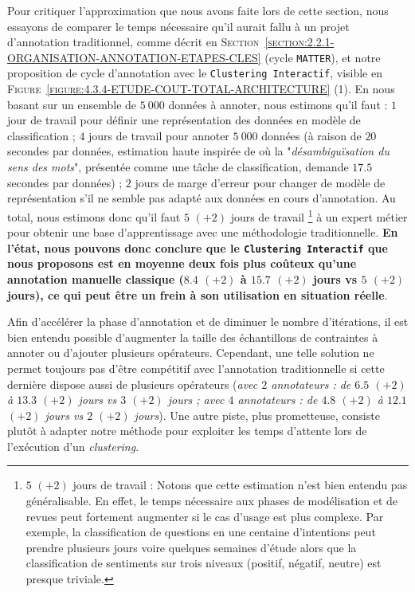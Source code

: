 			Pour critiquer l'approximation que nous avons faite lors de cette section, nous essayons de comparer le temps nécessaire qu'il aurait fallu à un projet d'annotation traditionnel, comme décrit en \textsc{Section~\ref{section:2.2.1-ORGANISATION-ANNOTATION-ETAPES-CLES}} (cycle \texttt{MATTER}), et notre proposition de cycle d'annotation avec le \texttt{Clustering Interactif}, visible en \textsc{Figure~\ref{figure:4.3.4-ETUDE-COUT-TOTAL-ARCHITECTURE}} (1).
			En nous basant sur un ensemble de $5~000$ données à annoter, nous estimons qu'il faut :
			$1$ jour de travail pour définir une représentation des données en modèle de classification ;
			$4$ jours de travail pour annoter $5~000$ données (à raison de $20$ secondes par données, estimation haute inspirée de \cite{pradhan-etal:2007:semeval2007-task-17} où la "\textit{désambiguïsation du sens des mots}", présentée comme une tâche de classification, demande $17.5$ secondes par données) ;
			$2$ jours de marge d'erreur pour changer de modèle de représentation s'il ne semble pas adapté aux données en cours d'annotation.
			Au total, nous estimons donc qu'il faut $5$ {\footnotesize $(+2)$} jours de travail \footnote{
				$5$ {\footnotesize $(+2)$} jours de travail : Notons que cette estimation n'est bien entendu pas généralisable.
				En effet, le temps nécessaire aux phases de modélisation et de revues peut fortement augmenter si le cas d'usage est plus complexe.
				Par exemple, la classification de questions en une centaine d'intentions peut prendre plusieurs jours voire quelques semaines d'étude alors que la classification de sentiments sur trois niveaux (positif, négatif, neutre) est presque triviale.
			} à un expert métier pour obtenir une base d'apprentissage avec une méthodologie traditionnelle.
			\textbf{En l'état, nous pouvons donc conclure que le \texttt{Clustering Interactif} que nous proposons est en moyenne deux fois plus coûteux qu'une annotation manuelle classique ($8.4$ {\footnotesize $(+2)$} à $15.7$ {\footnotesize $(+2)$} jours vs $5$ {\footnotesize $(+2)$} jours), ce qui peut être un frein à son utilisation en situation réelle}.
			
			Afin d'accélérer la phase d'annotation et de diminuer le nombre d'itérations, il est bien entendu possible d'augmenter la taille des échantillons de contraintes à annoter ou d'ajouter plusieurs opérateurs.
			Cependant, une telle solution ne permet toujours pas d'être compétitif avec l'annotation traditionnelle si cette dernière dispose aussi de plusieurs opérateurs (\textit{avec $2$ annotateurs : de $6.5$ {\footnotesize $(+2)$} à $13.3$ {\footnotesize $(+2)$} jours vs $3$ {\footnotesize $(+2)$} jours ; avec $4$ annotateurs : de $4.8$ {\footnotesize $(+2)$} à $12.1$ {\footnotesize $(+2)$} jours vs $2$ {\footnotesize $(+2)$} jours}).
			Une autre piste, plus prometteuse, consiste plutôt à adapter notre méthode pour exploiter les temps d'attente lors de l'exécution d'un \textit{clustering}.
			

